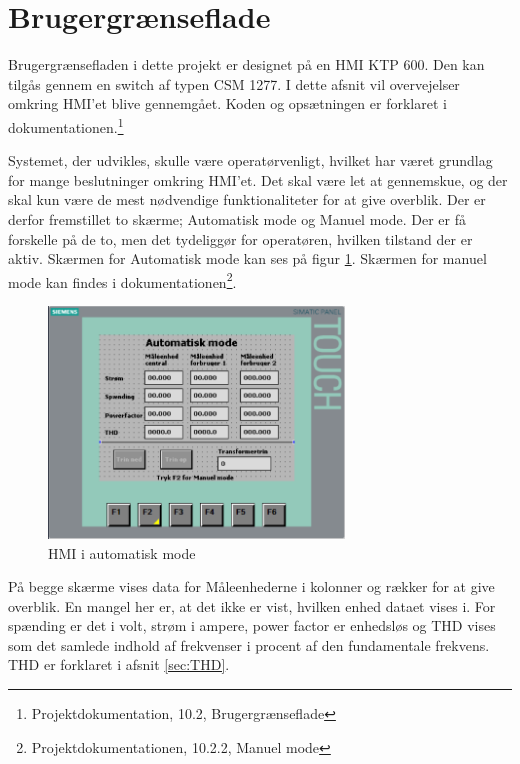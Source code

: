 

\section{Brugergrænseflade}

Brugergrænsefladen i dette projekt er designet på en HMI KTP 600. Den kan tilgås gennem en switch af typen CSM 1277. I dette afsnit vil overvejelser omkring HMI'et blive gennemgået. Koden og opsætningen er forklaret i dokumentationen.\footnote{Projektdokumentation, 10.2, Brugergrænseflade}


Systemet, der udvikles, skulle være operatørvenligt, hvilket har været grundlag for mange beslutninger omkring HMI'et. Det skal være let at gennemskue, og der skal kun være de mest nødvendige funktionaliteter for at give overblik.
Der er derfor fremstillet to skærme; Automatisk mode og Manuel mode. Der er få forskelle på de to, men det tydeliggør for operatøren, hvilken tilstand der er aktiv. Skærmen for Automatisk mode kan ses på figur \ref{fig:HMIAutomatiskModeDesign}. Skærmen for manuel mode kan findes i dokumentationen\footnote{Projektdokumentationen, 10.2.2, Manuel mode}.

\begin{figure}[H] %
	\centering
	\includegraphics[width=0.7\textwidth]{Figure/HMIAutomatiskModeDesign}
	\caption{HMI i automatisk mode}
	\label{fig:HMIAutomatiskModeDesign}
\end{figure}

På begge skærme vises data for Måleenhederne i kolonner og rækker for at give overblik. En mangel her er, at det ikke er vist, hvilken enhed dataet vises i. For spænding er det i volt, strøm i ampere, power factor er enhedsløs og THD vises som det samlede indhold af frekvenser i procent af den fundamentale frekvens. THD er forklaret i afsnit \ref{sec:THD}.


